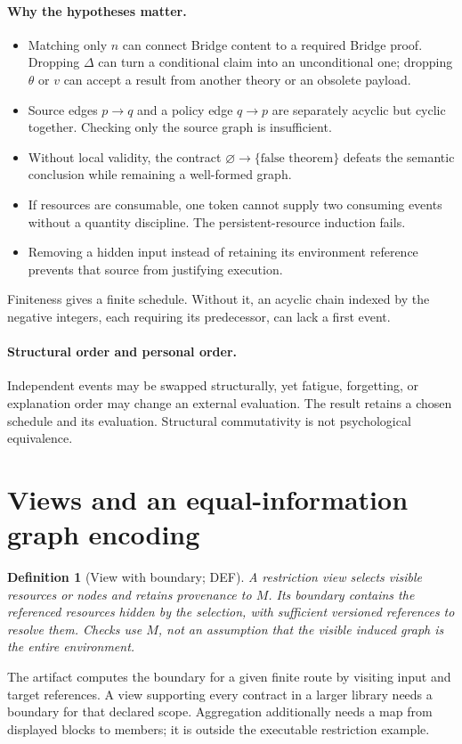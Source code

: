 \documentclass[11pt,a4paper]{article}
\newtheorem{definition}{Definition}[section]
\theoremstyle{remark}
\newcommand{\status}[1]{\textsf{\small #1}}
\begin{document}
\paragraph{Why the hypotheses matter.}
\begin{itemize}
\item Matching only \(n\) can connect Bridge content to a required Bridge
proof. Dropping \(\Delta\) can turn a conditional claim into an unconditional
one; dropping \(\theta\) or \(v\) can accept a result from another theory or
an obsolete payload.
\item Source edges \(p\to q\) and a policy edge \(q\to p\) are separately
acyclic but cyclic together. Checking only the source graph is insufficient.
\item Without local validity, the contract
\(\varnothing\to\{\text{false theorem}\}\) defeats the semantic conclusion
while remaining a well-formed graph.
\item If resources are consumable, one token cannot supply two consuming
events without a quantity discipline. The persistent-resource induction fails.
\item Removing a hidden input instead of retaining its environment reference
prevents that source from justifying execution.
\end{itemize}
Finiteness gives a finite schedule. Without it, an acyclic chain indexed by
the negative integers, each requiring its predecessor, can lack a first event.

\paragraph{Structural order and personal order.}
Independent events may be swapped structurally, yet fatigue, forgetting, or
explanation order may change an external evaluation. The result retains a
chosen schedule and its evaluation. Structural commutativity is not
psychological equivalence.

\section{Views and an equal-information graph encoding}\label{sec:views}
\begin{definition}[View with boundary; \status{DEF}]
A restriction view selects visible resources or nodes and retains provenance
to \(M\). Its boundary contains the referenced resources hidden by the
selection, with sufficient versioned references to resolve them.
Checks use \(M\), not an assumption that the visible induced graph is the
entire environment.
\end{definition}
The artifact computes the boundary for a given finite route by visiting
input and target references. A view supporting every contract in a larger
library needs a boundary for that declared scope. Aggregation additionally
needs a map from displayed blocks to members; it is outside the executable
restriction example.
\end{document}
